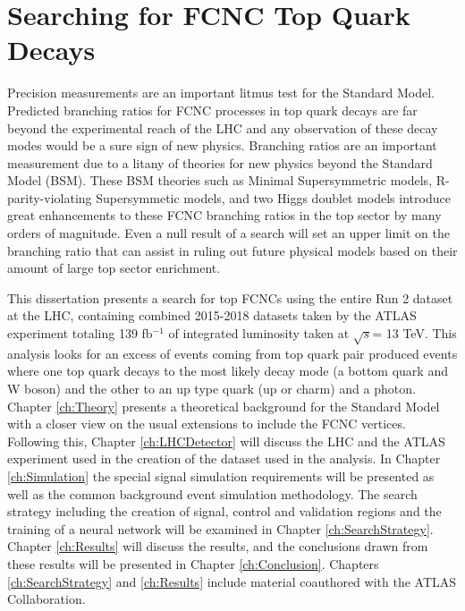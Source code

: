 \section{Searching for FCNC Top Quark Decays}
Precision measurements are an important litmus test for the Standard Model.  Predicted branching ratios for FCNC processes in top quark decays are far beyond the experimental reach of the LHC and any observation of these decay modes would be a sure sign of new physics.  Branching ratios are an important measurement due to a litany of theories for new physics beyond the Standard Model (BSM).  These BSM theories  such as Minimal Supersymmetric models\cite{MSSM}, R-parity-violating Supersymmetic models\cite{RPVSUSY}, and two Higgs doublet models\cite{2HDM} introduce great enhancements to these FCNC branching ratios in the top sector by many orders of magnitude.  Even a null result of a search will set an upper limit on the branching ratio that can assist in ruling out future physical models based on their amount of large top sector enrichment.

This dissertation presents a search for top FCNCs using the entire Run 2 dataset at the LHC, containing combined 2015-2018 datasets taken by the ATLAS experiment totaling 139 fb$^{-1}$ of integrated luminosity taken at $\sqrt{s}$= 13 TeV.  This analysis looks for an excess of events coming from top quark pair produced events where one top quark decays to the most likely decay mode (a bottom quark and W boson) and the other to an up type quark (up or charm) and a photon. Chapter \ref{ch:Theory} presents a theoretical background for the Standard Model with a closer view on the usual extensions to include the FCNC vertices.  Following this,  Chapter \ref{ch:LHCDetector} will discuss the LHC and the ATLAS experiment used in the creation of the dataset used in the analysis.  In Chapter \ref{ch:Simulation} the special signal simulation requirements will be presented as well as the common background event simulation methodology.  The search strategy including the creation of signal, control and validation regions and the training of a neural network will be examined in Chapter \ref{ch:SearchStrategy}.  Chapter \ref{ch:Results} will discuss the results, and the conclusions drawn from these results will be presented in Chapter \ref{ch:Conclusion}.  Chapters \ref{ch:SearchStrategy} and \ref{ch:Results} include material coauthored with the ATLAS Collaboration.